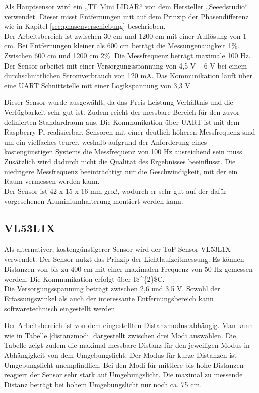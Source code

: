 Als Hauptsensor wird ein „TF Mini \ac{LIDAR}“ von dem Hersteller „Seeedstudio“ verwendet. Dieser misst Entfernungen mit auf dem Prinzip der Phasendifferenz wie in Kapitel \ref{sec:phasenverschiebung} beschrieben.\\
Der Arbeitsbereich ist zwischen 30 cm und 1200 cm mit einer Auflösung von 1 cm. Bei Entfernungen kleiner als 600 cm beträgt die Messungenauigkeit 1\%. Zwischen 600 cm und 1200 cm 2\%. Die Messfrequenz beträgt maximale 100 Hz.\\
Der Sensor arbeitet mit einer Versorgungsspannung von 4,5 V – 6 V bei einem durchschnittlichen Stromverbrauch von 120 mA. Das Kommunikation läuft über eine \ac{UART} Schnittstelle mit einer Logikspannung von 3,3 V

Dieser Sensor wurde ausgewählt, da das Preis-Leistung Verhältnis und die Verfügbarkeit sehr gut ist. Zudem reicht der messbare Bereich für den zuvor definierten Standardraum aus. Die Kommunikation über \ac{UART} ist mit dem Raspberry Pi realisierbar. Sensoren mit einer deutlich höheren Messfrequenz sind um ein vielfaches teurer, weshalb aufgrund der Anforderung eines kostengünstigen Systems die Messfrequenz von 100 Hz  ausreichend sein muss. Zusätzlich wird dadurch nicht die Qualität des Ergebnisses beeinflusst. Die niedrigere Messfrequenz beeinträchtigt nur die Geschwindigkeit, mit der ein Raum vermessen werden kann. \\
Der Sensor ist 42 x 15 x 16 mm groß, wodurch er sehr gut auf der dafür vorgesehenen Aluminiumhalterung montiert werden kann. \cite{TFMINI}


\subsection{VL53L1X} \label{sec:VL53L1X}

Als alternativer, kostengünstigerer Sensor wird der \ac{ToF}-Sensor VL53L1X verwendet. Der Sensor nutzt das Prinzip der Lichtlaufzeitmessung. Es können Distanzen von bis zu 400 cm mit einer maximalen Frequenz von 50 Hz gemessen werden. Die Kommunikation erfolgt über \ac{I$^{2}$C}. \\
Die Versorgungsspannung beträgt zwischen 2,6 und 3,5 V. Sowohl der Erfassungswinkel als auch der interessante Entfernungsbereich kann softwaretechnisch eingestellt werden. \cite{VL53L1X}

Der Arbeitsbereich ist von dem eingestellten Distanzmodus abhängig. Man kann wie in Tabelle \ref{distanzmodi} dargestellt zwischen drei Modi auswählen. Die Tabelle zeigt zudem die maximal messbare Distanz für den jeweiligen Modus in Abhängigkeit von dem Umgebungslicht. Der Modus für kurze Distanzen ist  Umgebungslicht unempfindlich. Bei den Modi für mittlere bis hohe Distanzen reagiert der Sensor sehr stark auf Umgebungslicht. Die maximal zu messende Distanz beträgt bei hohem Umgebungslicht nur noch ca. 75 cm. 

